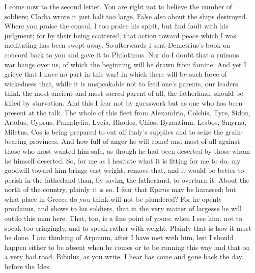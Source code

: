  I come now to the second letter. You are right not to believe the number of soldiers; Clodia wrote it just half too large. False also about the ships destroyed. Where you praise the consul, I too praise his spirit, but find fault with his judgment; for by their being scattered, that action toward peace which I was meditating has been swept away. So afterwards I sent Demetrius's book on concord back to you and gave it to Philotimus. Nor do I doubt that a ruinous war hangs over us, of which the beginning will be drawn from famine. And yet I grieve that I have no part in this war! In which there will be such force of wickedness that, while it is unspeakable not to feed one's parents, our leaders think the most ancient and most sacred parent of all, the fatherland, should be killed by starvation. And this I fear not by guesswork but as one who has been present at the talk. The whole of this fleet from Alexandria, Colchis, Tyre, Sidon, Aradus, Cyprus, Pamphylia, Lycia, Rhodes, Chios, Byzantium, Lesbos, Smyrna, Miletus, Cos is being prepared to cut off Italy's supplies and to seize the grain-bearing provinces. And how full of anger he will come! and most of all against those who most wanted him safe, as though he had been deserted by those whom he himself deserted. So, for me as I hesitate what it is fitting for me to do, my goodwill toward him brings vast weight; remove that, and it would be better to perish in the fatherland than, by saving the fatherland, to overturn it. About the north of the country, plainly it is so. I fear that Epirus may be harassed; but what place in Greece do you think will not be plundered? For he openly proclaims, and shows to his soldiers, that in the very matter of largesse he will outdo this man here. That, too, is a fine point of yours: when I see him, not to speak too cringingly, and to speak rather with weight. Plainly that is how it must be done. I am thinking of Arpinum, after I have met with him, lest I should happen either to be absent when he comes or to be running this way and that on a very bad road. Bibulus, as you write, I hear has come and gone back the day before the Ides.

